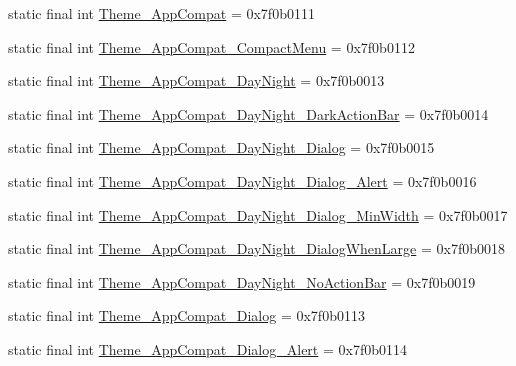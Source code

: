 \begin{CompactItemize}
\item 
static final int \hyperlink{classandroid_1_1support_1_1graphics_1_1drawable_1_1animated_1_1_r_1_1style_35eb82b808dbcbcc3da46b2be87acd05}{Theme\_\-AppCompat} = 0x7f0b0111
\item 
static final int \hyperlink{classandroid_1_1support_1_1graphics_1_1drawable_1_1animated_1_1_r_1_1style_682aac56e1eea4e44a26e9f5b9c00f34}{Theme\_\-AppCompat\_\-CompactMenu} = 0x7f0b0112
\item 
static final int \hyperlink{classandroid_1_1support_1_1graphics_1_1drawable_1_1animated_1_1_r_1_1style_3880860734a60d41ca1d3676e0dc190e}{Theme\_\-AppCompat\_\-DayNight} = 0x7f0b0013
\item 
static final int \hyperlink{classandroid_1_1support_1_1graphics_1_1drawable_1_1animated_1_1_r_1_1style_a6c0bff92c249a5ef69e8fdfa9750c7c}{Theme\_\-AppCompat\_\-DayNight\_\-DarkActionBar} = 0x7f0b0014
\item 
static final int \hyperlink{classandroid_1_1support_1_1graphics_1_1drawable_1_1animated_1_1_r_1_1style_f2fe846286faea045ce4ac82dba6f3e1}{Theme\_\-AppCompat\_\-DayNight\_\-Dialog} = 0x7f0b0015
\item 
static final int \hyperlink{classandroid_1_1support_1_1graphics_1_1drawable_1_1animated_1_1_r_1_1style_8b91df198f27a14b430f36da449826f1}{Theme\_\-AppCompat\_\-DayNight\_\-Dialog\_\-Alert} = 0x7f0b0016
\item 
static final int \hyperlink{classandroid_1_1support_1_1graphics_1_1drawable_1_1animated_1_1_r_1_1style_4fcf60f9792b3dfe92b07e26f59cdf43}{Theme\_\-AppCompat\_\-DayNight\_\-Dialog\_\-MinWidth} = 0x7f0b0017
\item 
static final int \hyperlink{classandroid_1_1support_1_1graphics_1_1drawable_1_1animated_1_1_r_1_1style_b2fea95dc051e21a371afba733994695}{Theme\_\-AppCompat\_\-DayNight\_\-DialogWhenLarge} = 0x7f0b0018
\item 
static final int \hyperlink{classandroid_1_1support_1_1graphics_1_1drawable_1_1animated_1_1_r_1_1style_2d1a4ec422b835d14786d223a9a24838}{Theme\_\-AppCompat\_\-DayNight\_\-NoActionBar} = 0x7f0b0019
\item 
static final int \hyperlink{classandroid_1_1support_1_1graphics_1_1drawable_1_1animated_1_1_r_1_1style_aae7c321252dbcb15235b7dfcbf52160}{Theme\_\-AppCompat\_\-Dialog} = 0x7f0b0113
\item 
static final int \hyperlink{classandroid_1_1support_1_1graphics_1_1drawable_1_1animated_1_1_r_1_1style_097050391435770be9f4d12d7e16e126}{Theme\_\-AppCompat\_\-Dialog\_\-Alert} = 0x7f0b0114

\end{CompactItemize}
